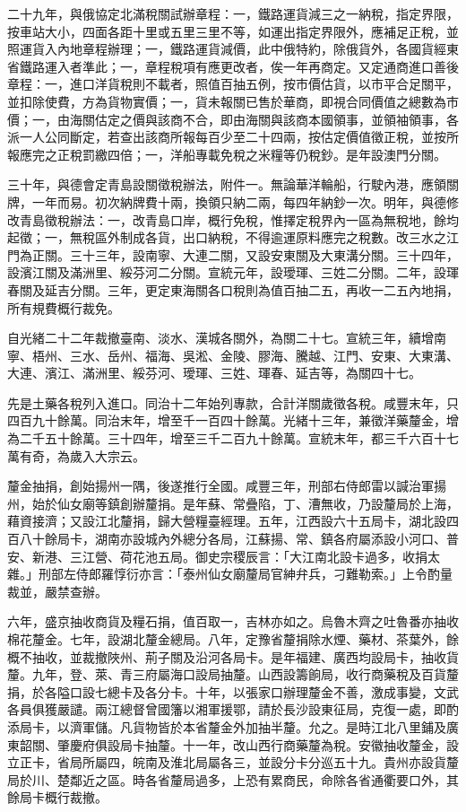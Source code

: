 \begin{pinyinscope}
二十九年，與俄協定北滿稅關試辦章程：一，鐵路運貨減三之一納稅，指定界限，按車站大小，四面各距十里或五里三里不等，如運出指定界限外，應補足正稅，並照運貨入內地章程辦理；一，鐵路運貨減價，此中俄特約，除俄貨外，各國貨經東省鐵路運入者準此；一，章程稅項有應更改者，俟一年再商定。又定通商進口善後章程：一，進口洋貨稅則不載者，照值百抽五例，按市價估貨，以市平合足關平，並扣除使費，方為貨物實價；一，貨未報關已售於華商，即視合同價值之總數為市價；一，由海關估定之價與該商不合，即由海關與該商本國領事，並領袖領事，各派一人公同斷定，若查出該商所報每百少至二十四兩，按估定價值徵正稅，並按所報應完之正稅罰繳四倍；一，洋船專載免稅之米糧等仍稅鈔。是年設澳門分關。

三十年，與德會定青島設關徵稅辦法，附件一。無論華洋輪船，行駛內港，應領關牌，一年而易。初次納牌費十兩，換領只納二兩，每四年納鈔一次。明年，與德修改青島徵稅辦法：一，改青島口岸，概行免稅，惟擇定稅界內一區為無稅地，餘均起徵；一，無稅區外制成各貨，出口納稅，不得逾運原料應完之稅數。改三水之江門為正關。三十三年，設南寧、大連二關，又設安東關及大東溝分關。三十四年，設濱江關及滿洲里、綏芬河二分關。宣統元年，設璦琿、三姓二分關。二年，設琿春關及延吉分關。三年，更定東海關各口稅則為值百抽二五，再收一二五內地捐，所有規費概行裁免。

自光緒二十二年裁撤臺南、淡水、漢城各關外，為關二十七。宣統三年，續增南寧、梧州、三水、岳州、福海、吳淞、金陵、膠海、騰越、江門、安東、大東溝、大連、濱江、滿洲里、綏芬河、璦琿、三姓、琿春、延吉等，為關四十七。

先是土藥各稅列入進口。同治十二年始列專款，合計洋關歲徵各稅。咸豐末年，只四百九十餘萬。同治末年，增至千一百四十餘萬。光緒十三年，兼徵洋藥釐金，增為二千五十餘萬。三十四年，增至三千二百九十餘萬。宣統末年，都三千六百十七萬有奇，為歲入大宗云。

釐金抽捐，創始揚州一隅，後遂推行全國。咸豐三年，刑部右侍郎雷以諴治軍揚州，始於仙女廟等鎮創辦釐捐。是年蘇、常疊陷，丁、漕無收，乃設釐局於上海，藉資接濟；又設江北釐捐，歸大營糧臺經理。五年，江西設六十五局卡，湖北設四百八十餘局卡，湖南亦設城內外總分各局，江蘇揚、常、鎮各府屬添設小河口、普安、新港、三江營、荷花池五局。御史宗稷辰言：「大江南北設卡過多，收捐太雜。」刑部左侍郎羅惇衍亦言：「泰州仙女廟釐局官紳弁兵，刁難勒索。」上令酌量裁並，嚴禁查辦。

六年，盛京抽收商貨及糧石捐，值百取一，吉林亦如之。烏魯木齊之吐魯番亦抽收棉花釐金。七年，設湖北釐金總局。八年，定豫省釐捐除水煙、藥材、茶葉外，餘概不抽收，並裁撤陜州、荊子關及沿河各局卡。是年福建、廣西均設局卡，抽收貨釐。九年，登、萊、青三府屬海口設局抽釐。山西設籌餉局，收行商藥稅及百貨釐捐，於各隘口設七總卡及各分卡。十年，以張家口辦理釐金不善，激成事變，文武各員俱獲嚴譴。兩江總督曾國籓以湘軍援鄂，請於長沙設東征局，克復一處，即酌添局卡，以濟軍儲。凡貨物皆於本省釐金外加抽半釐。允之。是時江北八里鋪及廣東韶關、肇慶府俱設局卡抽釐。十一年，改山西行商藥釐為稅。安徽抽收釐金，設立正卡，省局所屬四，皖南及淮北局屬各三，並設分卡分巡五十九。貴州亦設貨釐局於川、楚鄰近之區。時各省釐局過多，上恐有累商民，命除各省通衢要口外，其餘局卡概行裁撤。


\end{pinyinscope}
